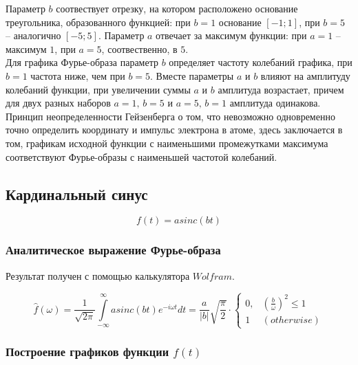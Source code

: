 \documentclass[a5paper, 10pt]{article}
\theoremstyle{definition}
\theoremstyle{plain}
\theoremstyle{remark}
\begin{document}
Параметр $b$ соотвествует отрезку, на котором расположено основание треугольника, образованного функцией: при $b=1$ основание $[-1; 1]$, при $b=5$ -- аналогично $[-5; 5]$. Параметр $a$ отвечает за максимум функции: при $a=1$ -- максимум $1$, при $a=5$, соотвественно, в $5$.\\

Для графика Фурье-образа параметр $b$ определяет частоту колебаний графика, при $b=1$ частота ниже, чем при $b=5$.  Вместе параметры $a$ и $b$ влияют на амплитуду колебаний функции, при увеличении суммы $a$ и $b$ амплитуда возрастает, причем для двух разных наборов $a = 1, \, b=5$ и $a=5, \, b=1$ амплитуда одинакова.\\

Принцип неопределенности Гейзенберга о том, что невозможно одновременно точно определить координату и импульс электрона в атоме, здесь заключается в том, графикам исходной функции с наименьшими промежутками максимума соответствуют Фурье-образы с наименьшей частотой колебаний.





\newpage
\subsection{Кардинальный синус}
\begin{equation}
f(t) = a sinc(bt)
\end{equation}


\subsubsection{Аналитическое выражение Фурье-образа}

Результат получен с помощью калькулятора $Wolfram$.

\begin{equation}
\hat{f}(\omega) =
 \frac{1}{\sqrt{2 \pi}} \int \limits_{-\infty}^{\infty}  a sinc(bt) e^{-i \omega t} dt = 
 \frac{a}{|b|} \sqrt{\frac{\pi}{2}} \cdot
\begin{cases}
0, & \left( \frac{b}{\omega} \right)^2 \leq 1\\
1 & (otherwise)
\end{cases}
\end{equation}


\subsubsection{Построение графиков функции $f(t)$}
\end{document}
